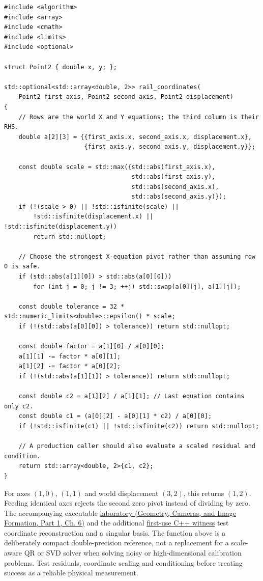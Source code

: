 \begin{verbatim}
#include <algorithm>
#include <array>
#include <cmath>
#include <limits>
#include <optional>

struct Point2 { double x, y; };

std::optional<std::array<double, 2>> rail_coordinates(
    Point2 first_axis, Point2 second_axis, Point2 displacement)
{
    // Rows are the world X and Y equations; the third column is their RHS.
    double a[2][3] = {{first_axis.x, second_axis.x, displacement.x},
                      {first_axis.y, second_axis.y, displacement.y}};

    const double scale = std::max({std::abs(first_axis.x),
                                   std::abs(first_axis.y),
                                   std::abs(second_axis.x),
                                   std::abs(second_axis.y)});
    if (!(scale > 0) || !std::isfinite(scale) ||
        !std::isfinite(displacement.x) || !std::isfinite(displacement.y))
        return std::nullopt;

    // Choose the strongest X-equation pivot rather than assuming row 0 is safe.
    if (std::abs(a[1][0]) > std::abs(a[0][0]))
        for (int j = 0; j != 3; ++j) std::swap(a[0][j], a[1][j]);

    const double tolerance = 32 * std::numeric_limits<double>::epsilon() * scale;
    if (!(std::abs(a[0][0]) > tolerance)) return std::nullopt;

    const double factor = a[1][0] / a[0][0];
    a[1][1] -= factor * a[0][1];
    a[1][2] -= factor * a[0][2];
    if (!(std::abs(a[1][1]) > tolerance)) return std::nullopt;

    const double c2 = a[1][2] / a[1][1]; // Last equation contains only c2.
    const double c1 = (a[0][2] - a[0][1] * c2) / a[0][0];
    if (!std::isfinite(c1) || !std::isfinite(c2)) return std::nullopt;

    // A production caller should also evaluate a scaled residual and condition.
    return std::array<double, 2>{c1, c2};
}
\end{verbatim}

For axes \((1,0)\), \((1,1)\) and world displacement \((3,2)\), this returns \((1,2)\). Feeding identical axes rejects the second zero pivot instead of dividing by zero. The accompanying executable \href{../03-Geometry-Cameras-and-Image-Formation-P01/main.pdf\#nameddest=02-foundations-ii-ch037-a-complete-scalar-laboratory-makes-the-story-executable}{laboratory (Geometry, Cameras, and Image Formation, Part 1, Ch. 6)} and the additional \hyperref[source-file-a41016f2e326b40cdff18ff4]{first-use C++ witness} test coordinate reconstruction and a singular basis. The function above is a deliberately compact double-precision reference, not a replacement for a scale-aware QR or SVD solver when solving noisy or high-dimensional calibration problems. Test residuals, coordinate scaling and conditioning before treating success as a reliable physical measurement.

